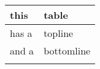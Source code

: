 \begin{tabular}{ll}
 \lsptoprule
this & table\\
\midrule
has a & topline\\
and a & bottomline\\
\lspbottomrule
\end{tabular}

